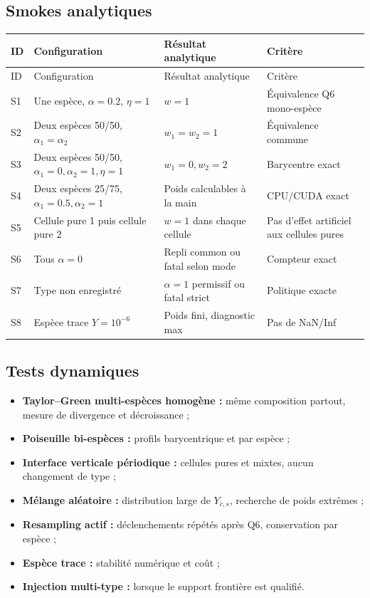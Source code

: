 \documentclass[11pt,a4paper]{article}
\begin{document}
\subsection{Smokes analytiques}

\begin{longtable}{@{}p{}p{}p{}p{}@{}}
\toprule
ID & Configuration & Résultat analytique & Critère \\
\midrule
\endfirsthead
\toprule
ID & Configuration & Résultat analytique & Critère \\
\midrule
\endhead
S1 & Une espèce, \(\alpha=0.2\), \(\eta=1\) & \(w=1\) & Équivalence Q6 mono-espèce \\
S2 & Deux espèces 50/50, \(\alpha_1=\alpha_2\) & \(w_1=w_2=1\) & Équivalence commune \\
S3 & Deux espèces 50/50, \(\alpha_1=0,\alpha_2=1,\eta=1\) & \(w_1=0,w_2=2\) & Barycentre exact \\
S4 & Deux espèces 25/75, \(\alpha_1=0.5,\alpha_2=1\) & Poids calculables à la main & CPU/CUDA exact \\
S5 & Cellule pure 1 puis cellule pure 2 & \(w=1\) dans chaque cellule & Pas d'effet artificiel aux cellules pures \\
S6 & Tous \(\alpha=0\) & Repli common ou fatal selon mode & Compteur exact \\
S7 & Type non enregistré & \(\alpha=1\) permissif ou fatal strict & Politique exacte \\
S8 & Espèce trace \(Y=10^{-6}\) & Poids fini, diagnostic max & Pas de NaN/Inf \\
\bottomrule
\end{longtable}

\subsection{Tests dynamiques}

\begin{itemize}
  \item \textbf{Taylor--Green multi-espèces homogène :} même composition partout, mesure de divergence et décroissance ;
  \item \textbf{Poiseuille bi-espèces :} profils barycentrique et par espèce ;
  \item \textbf{Interface verticale périodique :} cellules pures et mixtes, aucun changement de type ;
  \item \textbf{Mélange aléatoire :} distribution large de \(Y_{c,s}\), recherche de poids extrêmes ;
  \item \textbf{Resampling actif :} déclenchements répétés après Q6, conservation par espèce ;
  \item \textbf{Espèce trace :} stabilité numérique et coût ;
  \item \textbf{Injection multi-type :} lorsque le support frontière est qualifié.
\end{itemize}
\end{document}
